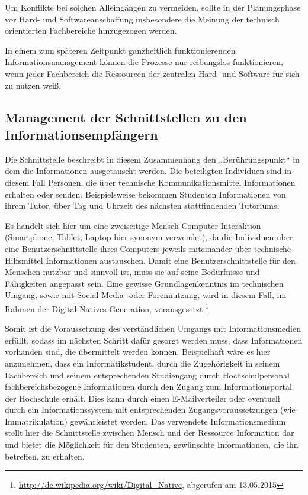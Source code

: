 Um Konflikte bei solchen \glqq Alleingängen\grqq{} zu vermeiden, sollte in der Planungsphase vor 
Hard- und Softwareanschaffung insbesondere die Meinung der technisch orientierten 
Fachbereiche hinzugezogen werden. 

In einem zum späteren Zeitpunkt ganzheitlich funktionierenden Informationsmanagement 
können die Prozesse nur reibungslos funktionieren, wenn jeder Fachbereich die Ressourcen 
der zentralen Hard- und Software für sich zu nutzen weiß.

\subsection{Management der Schnittstellen zu den Informationsempfängern}
\label{subsection_management_schnittstellen_infoempfangern}
Die Schnittstelle beschreibt in diesem Zusammenhang den „Berührungspunkt“ in dem 
die Informationen ausgetauscht werden. Die beteiligten Individuen sind in diesem Fall 
Personen, die über technische Kommunikationsmittel Informationen erhalten oder senden. 
Beispielsweise bekommen Studenten Informationen von ihrem Tutor, über Tag und Uhrzeit 
des nächsten stattfindenden Tutoriums. 

Es handelt sich hier um eine zweiseitige Mensch-Computer-Interaktion (Smartphone, Tablet, 
Laptop hier synonym verwendet), da die Individuen über eine Benutzerschnittstelle ihres 
Computers jeweils miteinander über technische Hilfsmittel Informationen austauschen.
Damit eine Benutzerschnittstelle für den Menschen nutzbar und sinnvoll ist, muss sie auf 
seine Bedürfnisse und Fähigkeiten angepasst sein. Eine gewisse Grundlagenkenntnis im 
technischen Umgang, sowie mit Social-Media- oder Forennutzung, wird in diesem Fall, 
im Rahmen der Digital-Natives-Generation, vorausgesetzt.\footnote{\url{http://de.wikipedia.org/wiki/Digital_Native}, abgerufen am 13.05.2015} 

Somit ist die Voraussetzung des verständlichen Umgangs mit Informationsmedien erfüllt, 
sodass im nächsten Schritt dafür gesorgt werden muss, dass Informationen vorhanden sind, 
die übermittelt werden können. Beispielhaft wäre es hier anzunehmen, dass ein Informatikstudent, 
durch die Zugehörigkeit in seinem Fachbereich und seinem entsprechenden Studiengang durch 
Hochschulpersonal fachbereichsbezogene Informationen durch den Zugang zum Informationsportal 
der Hochschule erhält. Dies kann durch einen E-Mailverteiler oder eventuell durch ein 
Informationssystem mit entsprechenden Zugangsvoraussetzungen (wie Immatrikulation) gewährleistet 
werden. Das verwendete Informationsmedium stellt hier die Schnittstelle zwischen Mensch und der 
Ressource Information dar und bietet die Möglichkeit für den Studenten, gewünschte Informationen, 
die ihn betreffen, zu erhalten.

